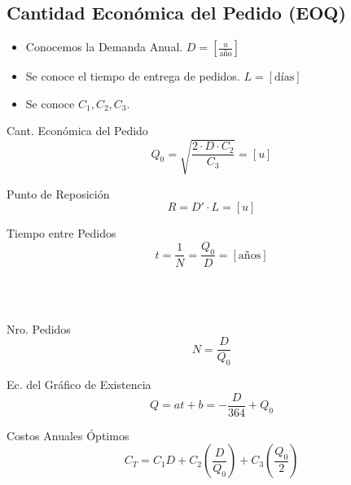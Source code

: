 \documentclass[10pt,letterpaper]{article}
\begin{document}
\subsection{Cantidad Económica del Pedido (EOQ)}
\begin{itemize}
\item Conocemos la Demanda Anual. $D = \left[ \frac{u}{\text{año}}\right] $
\item Se conoce el tiempo de entrega de pedidos. $L=[\text{días}]$
\item Se conoce $C_1,C_2,C_3$.
\end{itemize}
\begin{enumerate}
\noindent
\begin{minipage}[t]{.33\textwidth}
\raggedright
\item Cant. Económica del Pedido \noindent
$$Q_0 = \sqrt{ \dfrac{2\cdot D \cdot C_2}{C_3}}=[u]$$
\end{minipage}%
\begin{minipage}[t]{.33\textwidth}
\raggedright
\item Punto de Reposición \noindent
$$R=D'\cdot L = [u]$$
\end{minipage}%
\begin{minipage}[t]{.33\textwidth}
\raggedright
\item Tiempo entre Pedidos \noindent
$$t=\dfrac{1}{N}=\dfrac{Q_0}{D}=[\text{años}]$$
\end{minipage}
\\${ }$\\
\noindent
\begin{minipage}[t]{.5\textwidth}
\raggedright
\item Nro. Pedidos
$$N = \dfrac{D}{Q_0}$$
\end{minipage}%
\begin{minipage}[t]{.5\textwidth}
\raggedright
\item Ec. del Gráfico de Existencia
$$Q=at+b = -\dfrac{D}{364}+Q_0$$
\end{minipage}%
\item Costos Anuales Óptimos
$$C_T = C_1 D + C_2 \left( \dfrac{D}{Q_0} \right) + C_3 \left( \dfrac{Q_0}{2} \right)$$
\end{enumerate}
\end{document}
